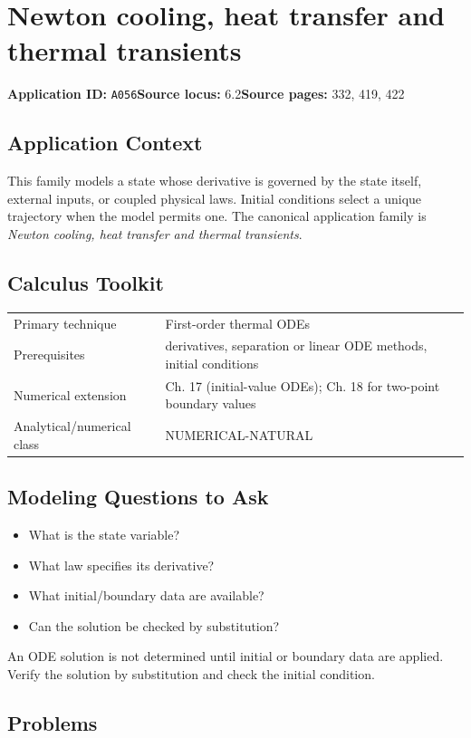 \documentclass[11pt]{book}
\newcommand{\pid}[1]{\texttt{#1}}
\begin{document}
\chapter{Newton cooling, heat transfer and thermal transients}\label{app:A056}
\textbf{Application ID:} \pid{A056}\quad \textbf{Source locus:} 6.2\quad \textbf{Source pages:} 332, 419, 422
\section*{Application Context}
This family models a state whose derivative is governed by the state itself, external inputs, or coupled physical laws. Initial conditions select a unique trajectory when the model permits one. The canonical application family is \emph{Newton cooling, heat transfer and thermal transients}.
\section*{Calculus Toolkit}
\begin{tabularx}{\textwidth}{@{}lX@{}}\toprule
Primary technique & First-order thermal ODEs \\
Prerequisites & derivatives, separation or linear ODE methods, initial conditions \\
Numerical extension & Ch. 17 (initial-value ODEs); Ch. 18 for two-point boundary values \\
Analytical/numerical class & NUMERICAL-NATURAL \\
\bottomrule\end{tabularx}
\section*{Modeling Questions to Ask}\begin{itemize}
\item What is the state variable?
\item What law specifies its derivative?
\item What initial/boundary data are available?
\item Can the solution be checked by substitution?
\end{itemize}
\begin{errorbox}An ODE solution is not determined until initial or boundary data are applied. Verify the solution by substitution and check the initial condition.\end{errorbox}
\section*{Problems}
\end{document}
